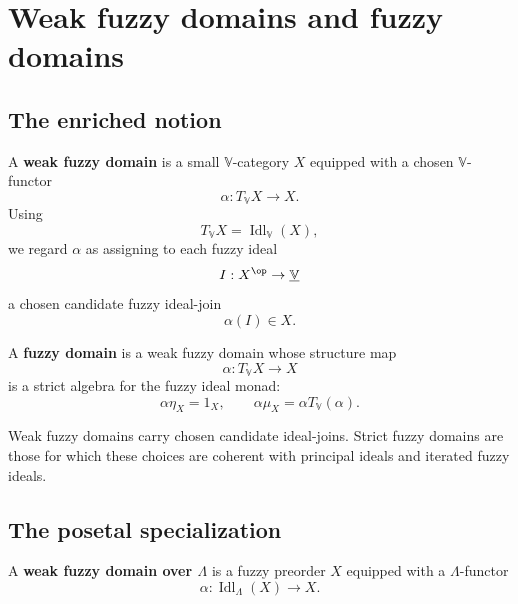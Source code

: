 \section{Weak fuzzy domains and fuzzy domains}
\label{sec:weak-fuzzy-domains-fuzzy-domains}

\subsection{The enriched notion}
\label{subsec:weak-fuzzy-domains-enriched}

\begin{definition}
\label{def:weak-fuzzy-domain-enriched}
A \textbf{weak fuzzy domain} is a small \(\mathbb V\)-category \(X\) equipped with
a chosen \(\mathbb V\)-functor
\[
    \alpha:T_{\mathbb V}X\to X.
\]
Using
\[
    T_{\mathbb V}X=\operatorname{Idl}_{\mathbb V}(X),
\]
we regard \(\alpha\) as assigning to each fuzzy ideal
\[
    I:X^{\op}\to\underline{\mathbb V}
\]
a chosen candidate fuzzy ideal-join
\[
    \alpha(I)\in X.
\]
\end{definition}

\begin{definition}
\label{def:fuzzy-domain-enriched}
A \textbf{fuzzy domain} is a weak fuzzy domain whose structure map
\[
    \alpha:T_{\mathbb V}X\to X
\]
is a strict algebra for the fuzzy ideal monad:
\[
    \alpha\eta_X=1_X,
    \qquad
    \alpha\mu_X=\alpha T_{\mathbb V}(\alpha).
\]
\end{definition}

\begin{remark}
Weak fuzzy domains carry chosen candidate ideal-joins.  Strict fuzzy domains are
those for which these choices are coherent with principal ideals and iterated
fuzzy ideals.
\end{remark}

\subsection{The posetal specialization}
\label{subsec:weak-fuzzy-domains-posetal}

\begin{definition}
\label{def:weak-fuzzy-domain-posetal}
A \textbf{weak fuzzy domain over \(\Lambda\)} is a fuzzy preorder \(X\) equipped
with a \(\Lambda\)-functor
\[
    \alpha:\operatorname{Idl}_\Lambda(X)\to X.
\]
\end{definition}

